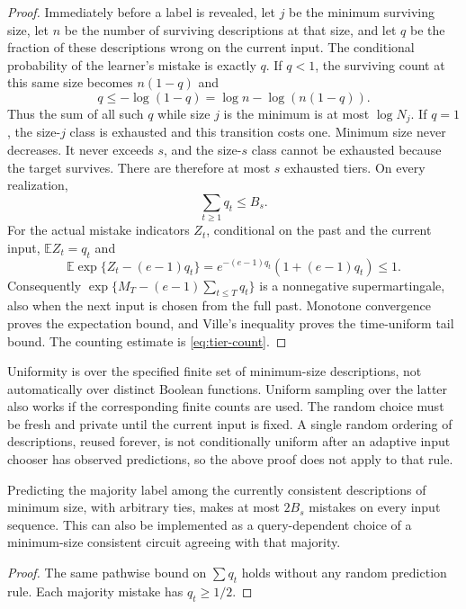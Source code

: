 \begin{proof}
Immediately before a label is revealed, let $j$ be the minimum surviving
size, let $n$ be the number of surviving descriptions at that size, and
let $q$ be the fraction of these descriptions wrong on the current input.
The conditional probability of the learner's mistake is exactly $q$.
If $q<1$, the surviving count at this same size becomes $n(1-q)$ and
\[
 q\le-\log(1-q)=\log n-\log(n(1-q)).
\]
Thus the sum of all such $q$ while size $j$ is the minimum is at most
$\log N_j$. If $q=1$, the size-$j$ class is exhausted and this transition
costs one. Minimum size never decreases. It never exceeds $s$, and the
size-$s$ class cannot be exhausted because the target survives. There are
therefore at most $s$ exhausted tiers. On every realization,
\[
 \sum_{t\ge1}q_t\le B_s.
\]
For the actual mistake indicators $Z_t$, conditional on the past and the
current input, $\mathbb E Z_t=q_t$ and
\[
 \mathbb E\exp\{Z_t-(e-1)q_t\}
 =e^{-(e-1)q_t}(1+(e-1)q_t)\le1.
\]
Consequently $\exp\{M_T-(e-1)\sum_{t\le T}q_t\}$ is a nonnegative
supermartingale, also when the next input is chosen from the full past.
Monotone convergence proves the expectation bound, and Ville's inequality
proves the time-uniform tail bound. The counting estimate is \eqref{eq:tier-count}.
\end{proof}

\begin{remark}
Uniformity is over the specified finite set of minimum-size descriptions,
not automatically over distinct Boolean functions. Uniform sampling over
the latter also works if the corresponding finite counts are used.
The random choice must be fresh and private until the current input is
fixed. A single random ordering of descriptions, reused forever, is not
conditionally uniform after an adaptive input chooser has observed
predictions, so the above proof does not apply to that rule.
\end{remark}

\begin{corollary}\label{cor:minimum-majority}
Predicting the majority label among the currently consistent descriptions
of minimum size, with arbitrary ties, makes at most $2B_s$ mistakes on
every input sequence. This can also be implemented as a query-dependent
choice of a minimum-size consistent circuit agreeing with that majority.
\end{corollary}

\begin{proof}
The same pathwise bound on $\sum q_t$ holds without any random prediction
rule. Each majority mistake has $q_t\ge1/2$.
\end{proof}


